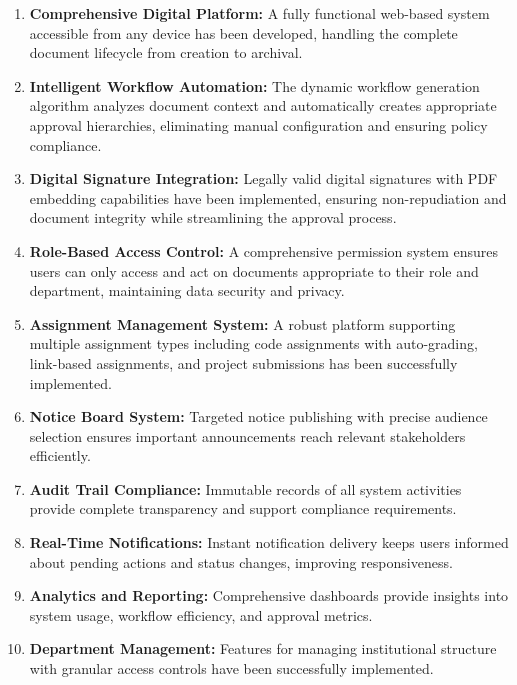 \begin{enumerate}
\item \textbf{Comprehensive Digital Platform:} A fully functional web-based system accessible from any device has been developed, handling the complete document lifecycle from creation to archival.

\item \textbf{Intelligent Workflow Automation:} The dynamic workflow generation algorithm analyzes document context and automatically creates appropriate approval hierarchies, eliminating manual configuration and ensuring policy compliance.

\item \textbf{Digital Signature Integration:} Legally valid digital signatures with PDF embedding capabilities have been implemented, ensuring non-repudiation and document integrity while streamlining the approval process.

\item \textbf{Role-Based Access Control:} A comprehensive permission system ensures users can only access and act on documents appropriate to their role and department, maintaining data security and privacy.

\item \textbf{Assignment Management System:} A robust platform supporting multiple assignment types including code assignments with auto-grading, link-based assignments, and project submissions has been successfully implemented.

\item \textbf{Notice Board System:} Targeted notice publishing with precise audience selection ensures important announcements reach relevant stakeholders efficiently.

\item \textbf{Audit Trail Compliance:} Immutable records of all system activities provide complete transparency and support compliance requirements.

\item \textbf{Real-Time Notifications:} Instant notification delivery keeps users informed about pending actions and status changes, improving responsiveness.

\item \textbf{Analytics and Reporting:} Comprehensive dashboards provide insights into system usage, workflow efficiency, and approval metrics.

\item \textbf{Department Management:} Features for managing institutional structure with granular access controls have been successfully implemented.
\end{enumerate}

